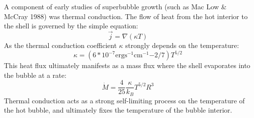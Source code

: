 \documentclass[extrafontsizes, 30pt]{memoir}
\begin{document}
\color{white}
A component of early studies of superbubble growth (such as Mac Low \& McCray
1988) was thermal conduction.
The flow of heat from the hot interior to the shell is
governed by the simple equation:
$$\vec j = \nabla (\kappa T)$$
As the thermal conduction coefficient $\kappa$ strongly depends on the
temperature:
$$\kappa = (6*10^{-7}  \mathrm{erg s^{-1} cm^{-1} {-2/7}})T^{5/2}$$
This heat flux ultimately manifests as a mass flux where the shell evaporates
into the bubble at a rate:
$$\dot M = \frac{4}{25}\frac{\kappa}{k_B} T^{5/2}R^3$$
Thermal conduction acts as a strong self-limiting process on the temperature
of the hot bubble, and ultimately fixes the temperature of the bubble interior.
\end{document}
